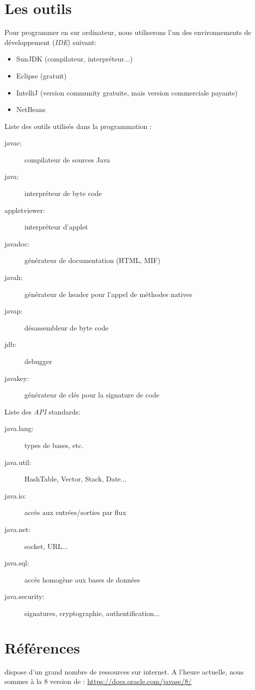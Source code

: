 		
		\section{Les outils}
		
			Pour programmer en \lang{} sur ordinateur, nous utiliserons l'un des environnements de développement (\emph{IDE}) suivant:
				\begin{itemize}
					\item SunJDK (compilateur, interpréteur...)
					\item Eclipse (gratuit)
					\item IntelliJ (version \og community\fg{} gratuite, mais version commerciale payante)
					\item NetBeans
				\end{itemize}
			Liste des outils utilisés dans la programmation \lang{}:
				\begin{description}
					\item[javac:] compilateur de sources Java
					\item[java:] interpréteur de byte code
					\item[appletviewer:] interpréteur d'applet
					\item[javadoc:] générateur de documentation (HTML, MIF)
					\item[javah:] générateur de header pour l'appel de méthodes natives
					\item[javap:] désassembleur de byte code
					\item[jdb:] debugger
					\item[javakey:] générateur de clés pour la signature de code
				\end{description}
			Liste des \emph{API} standards:
				\begin{description}
					\item[java.lang:] types de bases, etc.
					\item[java.util:] HashTable, Vector, Stack, Date...
					\item[java.io:] accès aux entrées/sorties par flux
					\item[java.net:] socket, URL...
					\item[java.sql:] accès homogène aux bases de données
					\item[java.security:] signatures, cryptographie, authentification...
				\end{description}
		
		\section{Références}
		
			\lang{} dispose d'un grand nombre de ressources sur internet. A l'heure actuelle, nous sommes à la 8\ieme{} version de \lang{}: \url{https://docs.oracle.com/javase/8/}